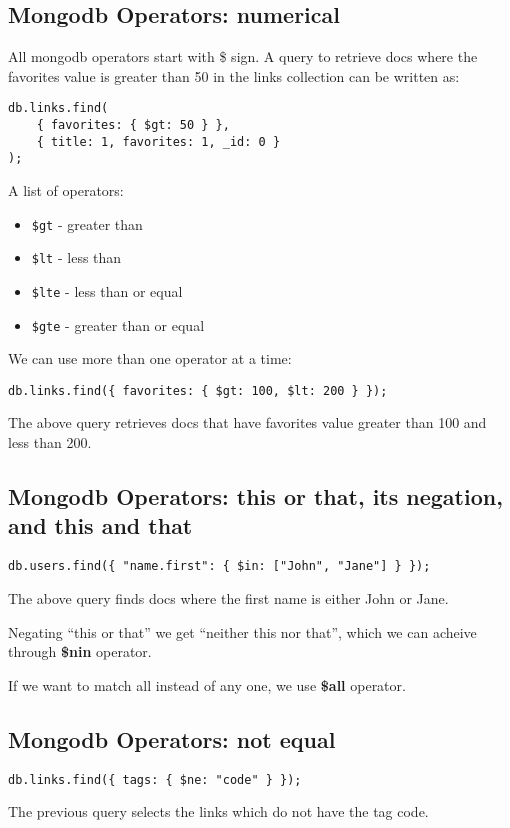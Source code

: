 \documentclass[a4paper, 12pt]{article}
\begin{document}
\subsection{Mongodb Operators: numerical}
All mongodb operators start with \$ sign.
A query to retrieve docs where the favorites value is greater than 50 in the links collection can be written as:
\begin{verbatim}
db.links.find(
	{ favorites: { $gt: 50 } },
	{ title: 1, favorites: 1, _id: 0 }
);
\end{verbatim}
A list of operators:
\begin{itemize}
	\item \verb|$gt| - greater than		
	\item \verb|$lt| - less than		
	\item \verb|$lte| - less than or equal
	\item \verb|$gte| - greater than or equal
\end{itemize}

We can use more than one operator at a time:
\begin{verbatim}
db.links.find({ favorites: { $gt: 100, $lt: 200 } });
\end{verbatim}
The above query retrieves docs that have favorites value greater than 100 and less than 200.
\subsection{Mongodb Operators: this or that, its negation, and this and that}
\begin{verbatim}
db.users.find({ "name.first": { $in: ["John", "Jane"] } });
\end{verbatim}
The above query finds docs where the first name is either John or Jane.

Negating ``this or that'' we get ``neither this nor that'', which we can acheive through \textbf{\$nin} operator.

If we want to match all instead of any one, we use \textbf{\$all} operator.
\subsection{Mongodb Operators: not equal}
\begin{verbatim}
db.links.find({ tags: { $ne: "code" } });
\end{verbatim}
The previous query selects the links which do not have the tag code.
\end{document}
